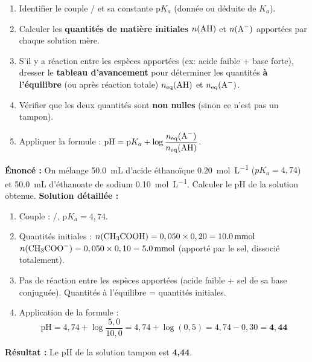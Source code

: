 \documentclass[11pt]{article}
\newcommand{\cle}[1]{{\popxbold\color{popdark}#1}}
\begin{document}
\begin{methode}
\begin{enumerate}
  \item Identifier le couple / et sa constante \cle{p$K_a$} (donnée ou déduite de $K_a$).
  \item Calculer les \textbf{quantités de matière initiales} $n(\ce{AH})$ et $n(\ce{A-})$ apportées par chaque solution mère.
  \item S'il y a réaction entre les espèces apportées (ex: acide faible + base forte), dresser le \textbf{tableau d'avancement} pour déterminer les quantités \textbf{à l'équilibre} (ou après réaction totale) $n_{\text{eq}}(\ce{AH})$ et $n_{\text{eq}}(\ce{A-})$.
  \item Vérifier que les deux quantités sont \textbf{non nulles} (sinon ce n'est pas un tampon).
  \item Appliquer la formule : $\mathrm{pH} = \mathrm{p}K_a + \log\dfrac{n_{\text{eq}}(\ce{A-})}{n_{\text{eq}}(\ce{AH})}$.
\end{enumerate}
\end{methode}

\begin{exoresolu}
\textbf{Énoncé :} On mélange \SI{50,0}{mL} d'acide éthanoïque  \SI{0,20}{mol.L^{-1}} ($pK_a = 4,74$) et \SI{50,0}{mL} d'éthanoate de sodium  \SI{0,10}{mol.L^{-1}}. Calculer le pH de la solution obtenue.
\textbf{Solution détaillée :}
\begin{enumerate}
  \item Couple : /, $\mathrm{p}K_a = 4,74$.
  \item Quantités initiales :
  $n(\ce{CH3COOH}) = 0,050 \times 0,20 = \SI{10,0}{mmol}$
  $n(\ce{CH3COO-}) = 0,050 \times 0,10 = \SI{5,0}{mmol}$ (apporté par le sel, dissocié totalement).
  \item Pas de réaction entre les espèces apportées (acide faible + sel de sa base conjuguée). Quantités à l'équilibre = quantités initiales.
  \item Application de la formule :
  \[ \mathrm{pH} = 4,74 + \log\frac{5,0}{10,0} = 4,74 + \log(0,5) = 4,74 - 0,30 = \mathbf{4,44} \]
\end{enumerate}
\textbf{Résultat :} Le pH de la solution tampon est \textbf{4,44}.
\end{exoresolu}
\end{document}
